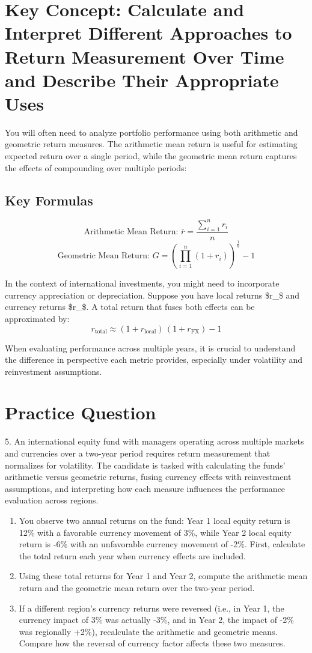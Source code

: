 \section*{Key Concept: Calculate and Interpret Different Approaches to Return Measurement Over Time and Describe Their Appropriate Uses}

You will often need to analyze portfolio performance using both arithmetic and geometric return measures. The arithmetic mean return is useful for estimating expected return over a single period, while the geometric mean return captures the effects of compounding over multiple periods:

\subsection*{Key Formulas}
\[
\text{Arithmetic Mean Return: } \bar{r} = \frac{\sum_{i=1}^{n} r_i}{n}
\]
\[
\text{Geometric Mean Return: } G = \left(\prod_{i=1}^{n} (1 + r_i)\right)^{\frac{1}{n}} - 1
\]

In the context of international investments, you might need to incorporate currency appreciation or depreciation. Suppose you have local returns \$r_{}\$ and currency returns \$r_{}\$. A total return that fuses both effects can be approximated by:
\[
r_{\text{total}} \approx (1 + r_{\text{local}})\,(1 + r_{\text{FX}}) - 1
\]

When evaluating performance across multiple years, it is crucial to understand the difference in perspective each metric provides, especially under volatility and reinvestment assumptions.

\section*{Practice Question}
5. An international equity fund with managers operating across multiple markets and currencies over a two-year period requires return measurement that normalizes for volatility. The candidate is tasked with calculating the funds' arithmetic versus geometric returns, fusing currency effects with reinvestment assumptions, and interpreting how each measure influences the performance evaluation across regions.

\begin{enumerate}
  \item You observe two annual returns on the fund: Year 1 local equity return is 12\% with a favorable currency movement of 3\%, while Year 2 local equity return is -6\% with an unfavorable currency movement of -2\%. First, calculate the total return each year when currency effects are included.
  \item Using these total returns for Year 1 and Year 2, compute the arithmetic mean return and the geometric mean return over the two-year period.
  \item If a different region's currency returns were reversed (i.e., in Year 1, the currency impact of 3\% was actually -3\%, and in Year 2, the impact of -2\% was regionally +2\%), recalculate the arithmetic and geometric means. Compare how the reversal of currency factor affects these two measures.
\end{enumerate}

